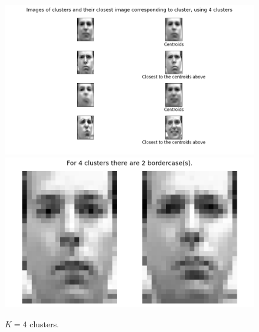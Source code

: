 \documentclass[12pt, letterpaper]{article}
\begin{document}
      \begin{figure}[H]
        \caption{$K = 4$ clusters.}
        \centering
        \includegraphics[scale=0.7]{cluster4}
        \includegraphics[scale=0.4]{border4}
      \end{figure}
\end{document}
